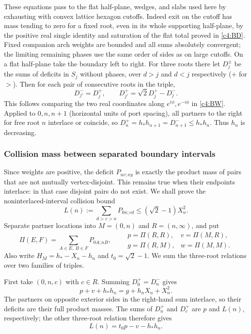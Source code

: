 These equations pass to the flat half-plane, wedges, and slabs used here by exhausting with convex lattice hexagon cutoffs. Indeed exit on the cutoff has mass tending to zero for a fixed root, even in its whole supporting half-plane, by the positive real single identity and saturation of the flat total proved in \eqref{c4:BD}. Fixed companion arch weights are bounded and all sums absolutely convergent; the limiting remaining phases use the same order of sides as on large cutoffs. On a flat half-plane take the boundary left to right. For three roots there let \(D_j^\pm\) be the sums of deficits in \(S_j\) without phases, over \(d>j\) and \(d<j\) respectively (\(+\) for \(>\)). Then for each pair of consecutive roots in the triple,
\[
              D_{j'}^-=D_j^+,\qquad D_{j'}^+=\sqrt2 D_j^+-D_j^- .
\]
This follows comparing the two real coordinates along \(e^{i\phi},e^{-i\phi}\) in \eqref{c4:BW}. Applied to \(0,n,n+1\) (horizontal units of port spacing), all partners to the right for free root \(n\) interlace or coincide, so \(D_n^+=h_* h_{n+1}=D_{n+1}^-\le h_* h_n\). Thus \(h_n\) is decreasing.

\subsubsection{Collision mass between separated boundary intervals}
Since weights are positive, the deficit $P_{uv;xy}$ is exactly the product
mass of pairs that are not mutually vertex-disjoint. This remains true
when their endpoints interlace: in that case disjoint pairs do not exist.
We shall prove the noninterlaced-interval collision bound
\begin{equation}
 L(n):=\sum_{d>c>n}P_{0 n;cd}\le(\sqrt2-1)X_n^2 .               \label{c4:BL}
\end{equation}
Separate partner locations into $M=(0,n)$ and $R=(n,\infty)$, and put
\[
 \Pi(E,F)=\sum_{A\in E,\ B\in F}P_{0A;nB},\qquad
 \begin{array}{ll}
 p=\Pi(R,R),&v=\Pi(M,R),\\
 g=\Pi(R,M),&w=\Pi(M,M).
 \end{array}
\]
Also write $H_M=h_*-X_n-h_n$ and $t_0=\sqrt2-1$.
We sum the three-root relations over two families of triples.

First take $(0,n,c)$ with $c\in R$. Summing $D_0^+=D_n^-$ gives
\[
 p+v+h_*h_n=g+h_nX_n+X_n^2.
\]
The partners on opposite exterior sides in the right-hand sum
interlace, so their deficits are their full product masses.
The sums of $D_n^+$ and $D_c^+$ are $p$ and $L(n)$, respectively;
the other three-root relation therefore gives
\[
 L(n)=t_0p-v-h_*h_n.
\]

